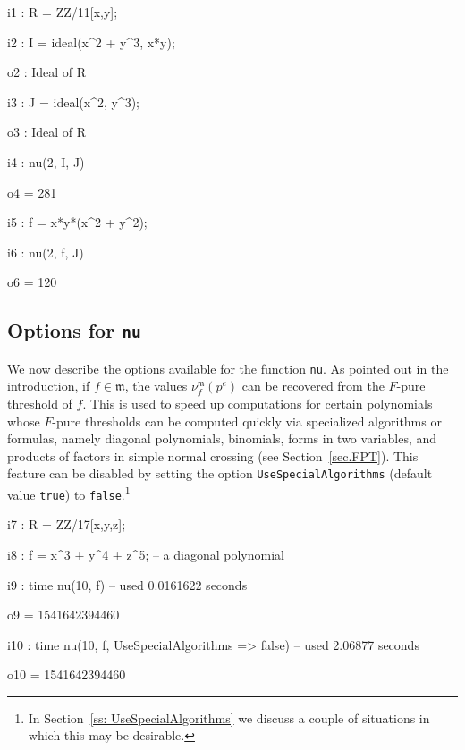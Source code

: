 \documentclass{amsart}
\begin{document}
\smallskip
{\small
{}
\begin{MyVerbatim}
i1 : R = ZZ/11[x,y];

i2 : I = ideal(x^2 + y^3, x*y);

o2 : Ideal of R

i3 : J = ideal(x^2, y^3);

o3 : Ideal of R

i4 : nu(2, I, J)

o4 = 281

i5 : f = x*y*(x^2 + y^2);

i6 : nu(2, f, J)

o6 = 120
\end{MyVerbatim}
}

\subsection{Options for \texttt{nu}}

We now describe the options available for the function \texttt{nu}.
As pointed out in the introduction, if $f \in \mathfrak{m}$, the values $\nu^{\mathfrak{m}}_f(p^e)$ can be recovered from the $F$-pure threshold of $f$.
This is used to speed up computations for certain polynomials whose $F$-pure thresholds can be computed quickly via specialized algorithms or formulas, namely diagonal polynomials, binomials, forms in two variables, and products of factors in simple normal crossing (see Section~\ref{sec.FPT}).
This feature can be disabled by setting the option \texttt{UseSpecialAlgorithms} (default value \texttt{true}) to \texttt{false}.\footnote{In Section~\ref{ss: UseSpecialAlgorithms} we discuss a couple of situations in which this may be desirable.}

\smallskip
{\small
{}
\begin{MyVerbatim}
i7 : R = ZZ/17[x,y,z];

i8 : f = x^3 + y^4 + z^5; -- a diagonal polynomial

i9 : time nu(10, f)
     -- used 0.0161622 seconds

o9 = 1541642394460

i10 : time nu(10, f, UseSpecialAlgorithms => false)
     -- used 2.06877 seconds

o10 = 1541642394460
\end{MyVerbatim}
}
\smallskip
\end{document}
